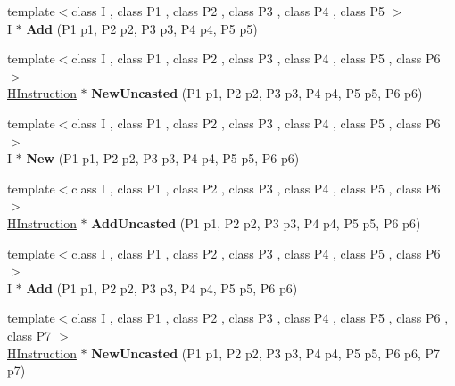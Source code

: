 \begin{DoxyCompactItemize}
\item 
{\footnotesize template$<$class I , class P1 , class P2 , class P3 , class P4 , class P5 $>$ }\\I $\ast$ {\bfseries Add} (P1 p1, P2 p2, P3 p3, P4 p4, P5 p5)\hypertarget{classv8_1_1internal_1_1_h_graph_builder_a24cb3477ef726cbccbe93ddec0b8894b}{}\label{classv8_1_1internal_1_1_h_graph_builder_a24cb3477ef726cbccbe93ddec0b8894b}

\item 
{\footnotesize template$<$class I , class P1 , class P2 , class P3 , class P4 , class P5 , class P6 $>$ }\\\hyperlink{classv8_1_1internal_1_1_h_instruction}{H\+Instruction} $\ast$ {\bfseries New\+Uncasted} (P1 p1, P2 p2, P3 p3, P4 p4, P5 p5, P6 p6)\hypertarget{classv8_1_1internal_1_1_h_graph_builder_a4d53a60ad9189df924c282a10cf5d73e}{}\label{classv8_1_1internal_1_1_h_graph_builder_a4d53a60ad9189df924c282a10cf5d73e}

\item 
{\footnotesize template$<$class I , class P1 , class P2 , class P3 , class P4 , class P5 , class P6 $>$ }\\I $\ast$ {\bfseries New} (P1 p1, P2 p2, P3 p3, P4 p4, P5 p5, P6 p6)\hypertarget{classv8_1_1internal_1_1_h_graph_builder_a610fa47d77c385921e3b3169d7834d6e}{}\label{classv8_1_1internal_1_1_h_graph_builder_a610fa47d77c385921e3b3169d7834d6e}

\item 
{\footnotesize template$<$class I , class P1 , class P2 , class P3 , class P4 , class P5 , class P6 $>$ }\\\hyperlink{classv8_1_1internal_1_1_h_instruction}{H\+Instruction} $\ast$ {\bfseries Add\+Uncasted} (P1 p1, P2 p2, P3 p3, P4 p4, P5 p5, P6 p6)\hypertarget{classv8_1_1internal_1_1_h_graph_builder_acbd23499ba4112eb9334a42f2b2f9613}{}\label{classv8_1_1internal_1_1_h_graph_builder_acbd23499ba4112eb9334a42f2b2f9613}

\item 
{\footnotesize template$<$class I , class P1 , class P2 , class P3 , class P4 , class P5 , class P6 $>$ }\\I $\ast$ {\bfseries Add} (P1 p1, P2 p2, P3 p3, P4 p4, P5 p5, P6 p6)\hypertarget{classv8_1_1internal_1_1_h_graph_builder_a1b9325be14c1a3c406f12bc8c311b5a4}{}\label{classv8_1_1internal_1_1_h_graph_builder_a1b9325be14c1a3c406f12bc8c311b5a4}

\item 
{\footnotesize template$<$class I , class P1 , class P2 , class P3 , class P4 , class P5 , class P6 , class P7 $>$ }\\\hyperlink{classv8_1_1internal_1_1_h_instruction}{H\+Instruction} $\ast$ {\bfseries New\+Uncasted} (P1 p1, P2 p2, P3 p3, P4 p4, P5 p5, P6 p6, P7 p7)\hypertarget{classv8_1_1internal_1_1_h_graph_builder_af4d9a5f99ae44c76f79e69b3f372132a}{}\label{classv8_1_1internal_1_1_h_graph_builder_af4d9a5f99ae44c76f79e69b3f372132a}


\end{DoxyCompactItemize}
